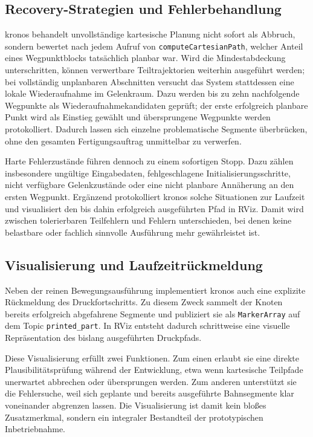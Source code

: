         \subsection{Recovery-Strategien und Fehlerbehandlung}
            \ac{kronos} behandelt unvollständige kartesische Planung nicht sofort als Abbruch,
            sondern bewertet nach jedem Aufruf von \texttt{computeCartesianPath},
            welcher Anteil eines Wegpunktblocks tatsächlich planbar war.
            Wird die Mindestabdeckung unterschritten,
            können verwertbare Teiltrajektorien weiterhin ausgeführt werden;
            bei vollständig unplanbaren Abschnitten versucht das System stattdessen eine lokale Wiederaufnahme im Gelenkraum.
            Dazu werden bis zu zehn nachfolgende Wegpunkte als Wiederaufnahmekandidaten geprüft;
            der erste erfolgreich planbare Punkt wird als Einstieg gewählt und übersprungene Wegpunkte werden protokolliert.
            Dadurch lassen sich einzelne problematische Segmente überbrücken,
            ohne den gesamten Fertigungsauftrag unmittelbar zu verwerfen.

            Harte Fehlerzustände führen dennoch zu einem sofortigen Stopp.
            Dazu zählen insbesondere ungültige Eingabedaten,
            fehlgeschlagene Initialisierungsschritte,
            nicht verfügbare Gelenkzustände oder eine nicht planbare Annäherung an den ersten Wegpunkt.
            Ergänzend protokolliert \ac{kronos} solche Situationen zur Laufzeit und visualisiert den bis dahin erfolgreich ausgeführten Pfad in RViz.
            Damit wird zwischen tolerierbaren Teilfehlern und Fehlern unterschieden,
            bei denen keine belastbare oder fachlich sinnvolle Ausführung mehr gewährleistet ist.

        \subsection{Visualisierung und Laufzeitrückmeldung}
            Neben der reinen Bewegungsausführung implementiert \ac{kronos} auch eine explizite Rückmeldung des Druckfortschritts.
            Zu diesem Zweck sammelt der Knoten bereits erfolgreich abgefahrene Segmente und publiziert sie als \texttt{MarkerArray} auf dem Topic \texttt{printed\_part}.
            In RViz entsteht dadurch schrittweise eine visuelle Repräsentation des bislang ausgeführten Druckpfads.

            Diese Visualisierung erfüllt zwei Funktionen.
            Zum einen erlaubt sie eine direkte Plausibilitätsprüfung während der Entwicklung,
            etwa wenn kartesische Teilpfade unerwartet abbrechen oder übersprungen werden.
            Zum anderen unterstützt sie die Fehlersuche,
            weil sich geplante und bereits ausgeführte Bahnsegmente klar voneinander abgrenzen lassen.
            Die Visualisierung ist damit kein bloßes Zusatzmerkmal,
            sondern ein integraler Bestandteil der prototypischen Inbetriebnahme.
        
